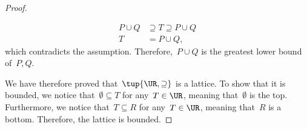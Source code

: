 \begin{lemma}
\begin{proof}
\begin{itemize}
\begin{equation}
\begin{aligned}
                    P\cup Q &\supseteq T\supseteq P\cup Q\\
                    T&=P\cup Q,
                \end{aligned}
            \end{equation}
            which contradicts the assumption. Therefore,~$P\cup Q$ is the greatest lower bound of~$P,Q$.
        \end{itemize}
        We have therefore proved that~$\tup{\UR,\supseteq}$ is a lattice. To show that it is bounded, we notice that~$\emptyset \subseteq T$ for any~$T\in \UR$, meaning that~$\emptyset$ is the top. Furthermore, we notice that~$T\subseteq R$ for any~$T\in \UR$, meaning that~$R$ is a bottom. Therefore, the lattice is bounded.
    \end{proof}
\end{lemma}

